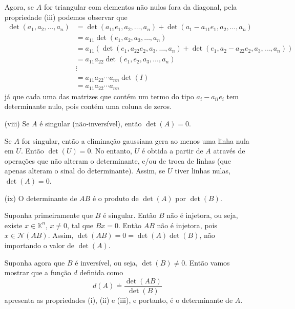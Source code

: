 \begin{itemize}
Agora, se $A$ for triangular com elementos não nulos fora da diagonal, pela propriedade (iii) podemos observar que
\begin{align*}
	\det(a_1,a_2,\ldots,a_n) &= \det(a_{11}e_1,a_2,\ldots,a_n)+\det(a_1-a_{11}e_1,a_2,\ldots,a_n)\\
    &= a_{11}\det(e_1,a_2,a_3,\ldots,a_n)\\
    &= a_{11}(\det(e_1,a_{22}e_2,a_3,\ldots,a_n)+\det(e_1,a_2-a_{22}e_2,a_3,\ldots,a_n))\\
    &= a_{11}a_{22}\det(e_1,e_2,a_3,\ldots,a_n)\\
    &\vdots\\
    &= a_{11}a_{22}\cdots a_{nn}\det(I)\\
    &= a_{11}a_{22}\cdots a_{nn}
\end{align*}
já que cada uma das matrizes que contém um termo do tipo $a_i-a_{ii}e_i$ tem determinante nulo, pois contém uma coluna de zeros.

\item[(viii)] Se $A$ é singular (não-inversível), então $\det(A)=0$. 

Se $A$ for singular, então a eliminação gaussiana gera ao menos uma linha nula em $U$. Então  $\det(U)=0$. No entanto, $U$ é obtida a partir de $A$ através de operações que não alteram o determinante, e/ou de troca de linhas (que apenas alteram o sinal do determinante). Assim, se $U$ tiver linhas nulas, $\det(A)=0$. 

\item[(ix)] O determinante de $AB$ é o produto de $\det(A)$ por $\det(B)$.

Suponha primeiramente que $B$ é singular. Então $B$ não é injetora, ou seja, existe $x\in {\mathbb{K}}^n$, $x\ne 0$, tal que $Bx=0$. Então $AB$ não é injetora, pois $x\in {\mathcal{N}}(AB)$. Assim, $\det(AB)=0=\det(A)\det(B)$, não importando o valor de $\det(A)$.

Suponha agora que $B$ é inversível, ou seja, $\det(B)\ne 0$. Então vamos mostrar que a função $d$ definida como
\begin{equation*}
	d(A) \doteq \frac{\det(AB)}{\det(B)}
\end{equation*}
apresenta as propriedades (i), (ii) e (iii), e portanto, é o determinante de $A$. 


\end{itemize}
